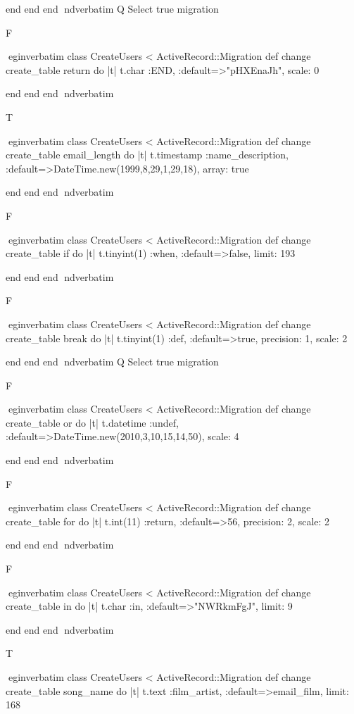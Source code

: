     end 
  end 
end
nd{verbatim}
Q
 Select true migration

F

egin{verbatim}
 class CreateUsers < ActiveRecord::Migration 
  def change 
    create_table return do |t| 
      t.char :END, :default=>"pHXEnaJh", scale: 0
    
    end 
  end 
end
nd{verbatim}

T

egin{verbatim}
 class CreateUsers < ActiveRecord::Migration 
  def change 
    create_table email_length do |t| 
      t.timestamp :name_description, :default=>DateTime.new(1999,8,29,1,29,18), array: true
    
    end 
  end 
end
nd{verbatim}

F

egin{verbatim}
 class CreateUsers < ActiveRecord::Migration 
  def change 
    create_table if do |t| 
      t.tinyint(1) :when, :default=>false, limit: 193
    
    end 
  end 
end
nd{verbatim}

F

egin{verbatim}
 class CreateUsers < ActiveRecord::Migration 
  def change 
    create_table break do |t| 
      t.tinyint(1) :def, :default=>true, precision: 1, scale: 2
    
    end 
  end 
end
nd{verbatim}
Q
 Select true migration

F

egin{verbatim}
 class CreateUsers < ActiveRecord::Migration 
  def change 
    create_table or do |t| 
      t.datetime :undef, :default=>DateTime.new(2010,3,10,15,14,50), scale: 4
    
    end 
  end 
end
nd{verbatim}

F

egin{verbatim}
 class CreateUsers < ActiveRecord::Migration 
  def change 
    create_table for do |t| 
      t.int(11) :return, :default=>56, precision: 2, scale: 2
    
    end 
  end 
end
nd{verbatim}

F

egin{verbatim}
 class CreateUsers < ActiveRecord::Migration 
  def change 
    create_table in do |t| 
      t.char :in, :default=>"NWRkmFgJ", limit: 9
    
    end 
  end 
end
nd{verbatim}

T

egin{verbatim}
 class CreateUsers < ActiveRecord::Migration 
  def change 
    create_table song_name do |t| 
      t.text :film_artist, :default=>email_film, limit: 168
    
